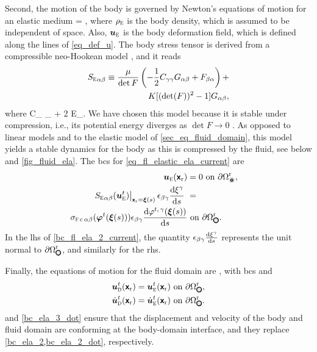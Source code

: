 Second,  the motion of the  body is governed by Newton's equations of motion for an elastic medium \cite{landauTheoryElasticity1986}
\be\label{eq_fl_elastic_ela_current}
\rhoela {} = \pderr{\Sela_{\alpha \beta}(\buela)}{\beta},
\ee
where  $\rhoela$ is the body density, which is assumed to be independent of space.
Also, $\buela$ is the body deformation field, which is defined along the lines of \cref{eq_def_u}.
The  body stress tensor is derived from a compressible neo-Hookean model \cite{bazilevsIsogeometricFluidstructureInteraction2008}, and it reads
\begin{align}
        \label{eq_def_S_neo_hookean}
        \Sela_{\alpha \beta} \equiv \frac{\muel}{\det F }\left(- \frac{1}{2} C_{\gamma \gamma} G_{\alpha \beta} + F_{\beta \alpha}\right) + & \newlinenn
        \kel [(\det(F))^2-1] G_{\alpha \beta},
\end{align}
where
\be
\label{eq_def_C}
C_{\alpha \beta } \equiv \delta_{\alpha \beta} + 2 E_{\alpha \beta}.
\ee
We have chosen this model because it is stable under compression, i.e., its potential energy diverges as $\det F \rightarrow 0$ \cite{bazilevsIsogeometricFluidstructureInteraction2008}. As opposed to linear models \cite{landauTheoryElasticity1986} and to the elastic model of  \cref{sec_eq_fluid_domain}, this model  yields a stable dynamics for the body as this is compressed  by  the fluid, see below and \cref{fig_fluid_ela}.
The \acp{bc} for \cref{eq_fl_elastic_ela_current} are
\begin{align}
        \label{bc_fl_ela_1_current}
        \buela(\bxr)                                                                                                              & =0               \text{ on }\pomcircineqr,   \\
        \label{bc_fl_ela_2_current}
        \left. \Sela_{\alpha \beta}(\buela^t)\right|_{\bxr = \bxi{s}} \epsilon_{\beta \gamma} \der{\xi^\gamma}{s}\                & =    \newlinenn
        \sigmastressc{\alpha}{\beta}(\bm{\varphi}^t(\bxi{s})) \epsilon_{\beta \gamma} \der{{\varphi}^{t, \, \gamma} (\bxi{s})}{s} & \text{ on } \pomcircouteqr.                &
\end{align}
In the \ac{lhs} of \cref{bc_fl_ela_2_current}, the quantity $\epsilon_{\beta \gamma} \frac{\text{d} {\xi^\gamma}}{\text{d} {s}}$ represents the unit normal to $\pomcircouteqr$, and similarly for the \ac{rhs}.


Finally, the equations of motion for the fluid domain are \crefs{\eqsdom}, with \acp{bc}  and
\begin{align}
        \label{bc_ela_3}
        \budom^t(\bxr)    & = \buela^t(\bxr) \text{ on } \pomcircouteqr,    \\
        \label{bc_ela_3_dot}
        \budomdot^t(\bxr) & = \bueladot^t(\bxr) \text{ on } \pomcircouteqr.
\end{align}
 and \cref{bc_ela_3_dot} ensure that the displacement and velocity of the  body and  fluid domain are conforming at the body-domain interface, and they replace  \cref{bc_ela_2,bc_ela_2_dot}, respectively.



